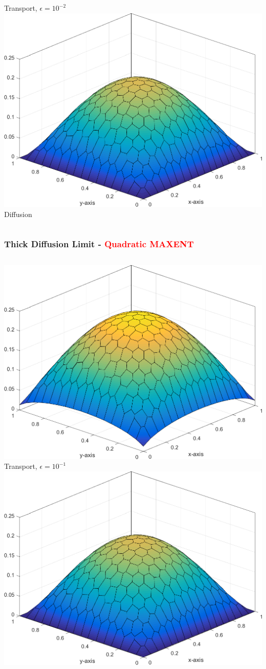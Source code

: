 \documentclass[compress,10pt]{beamer}
\newcommand{\tcr}[1]{\textcolor{red}{#1}}
\begin{document}
\begin{frame}[t]
{\begin{columns}
Transport, $\epsilon=10^{-2}$
{}\includegraphics[width=0.75\columnwidth]{images/Sq_poly_MAXENT_k=1.png}\\
Diffusion
\end{columns}
}
{
\frametitle{Thick Diffusion Limit - \tcr{Quadratic MAXENT}}
\begin{columns}
\centering
{}\includegraphics[width=0.75\columnwidth]{images/Sq_poly_MAXENT_k=2_ep=1e-1.png}\\
Transport, $\epsilon=10^{-1}$
{}\includegraphics[width=0.75\columnwidth]{images/Sq_poly_MAXENT_k=2_ep=1e-3.png}\\

\end{columns}}
\end{frame}
\end{document}
